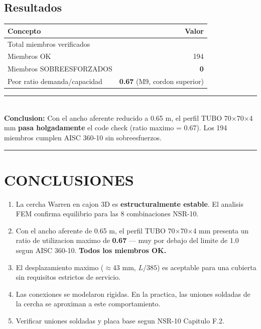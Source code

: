 \documentclass[12pt,a4paper]{article}
\newcommand{\tableheadrow}{\rowcolor{primary!15}\sffamily\footnotesize\bfseries\color{primary}}
\begin{document}
\subsection{Resultados}

\begin{center}
\begin{tabular}{l >{\sffamily}r}
\toprule
\tableheadrow
\textbf{Concepto} & \textbf{Valor} \\
\midrule
Total miembros verificados  & 194 \\
Miembros OK                 & \textcolor{secondary!80!black}{194} \\
\rowcolor{tablerow}
Miembros SOBREESFORZADOS    & \textcolor{accent}{\textbf{0}} \\
Peor ratio demanda/capacidad & \textbf{0.67} (M9, cordon superior) \\
\bottomrule
\end{tabular}
\end{center}

\vspace{0.5cm}
{
\sffamily\small
\color{primary!80}
\begin{center}
\begin{minipage}{0.85\textwidth}
\rule{\textwidth}{0.3pt}\\[4pt]
\textbf{Conclusion:} Con el ancho aferente reducido a 0.65 m, el perfil
TUBO 70$\times$70$\times$4 mm \textbf{pasa holgadamente} el code check
(ratio maximo = 0.67). Los 194 miembros cumplen AISC 360-10 sin sobreesfuerzos.\\[2pt]
\rule{\textwidth}{0.3pt}
\end{minipage}
\end{center}
}

\section{CONCLUSIONES}

{
\sffamily
\begin{enumerate}
    \item La cercha Warren en cajon 3D es \textbf{estructuralmente estable}.
          El analisis FEM confirma equilibrio para las 8 combinaciones NSR-10.

    \item Con el ancho aferente de 0.65 m, el perfil TUBO 70$\times$70$\times$4 mm
          presenta un ratio de utilizacion maximo de \textbf{0.67} — muy por debajo
          del limite de 1.0 segun AISC 360-10. \textbf{Todos los miembros OK.}

    \item El desplazamiento maximo ($\approx 43$ mm, $L/385$) es aceptable
          para una cubierta sin requisitos estrictos de servicio.

    \item Las conexiones se modelaron rigidas. En la practica, las uniones
          soldadas de la cercha se aproximan a este comportamiento.

    \item Verificar uniones soldadas y placa base segun NSR-10 Capitulo F.2.
\end{enumerate}
}
\end{document}
